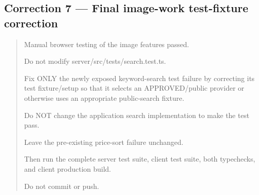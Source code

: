 \subsection*{Correction 7 --- Final image-work test-fixture correction}

\begin{quote}
Manual browser testing of the image features passed.

Do not modify server/src/tests/search.test.ts.

Fix ONLY the newly exposed keyword-search test failure by correcting its test fixture/setup so that it selects an APPROVED/public provider or otherwise uses an appropriate public-search fixture.

Do NOT change the application search implementation to make the test pass.

Leave the pre-existing price-sort failure unchanged.

Then run the complete server test suite, client test suite, both typechecks, and client production build.

Do not commit or push.
\end{quote}


